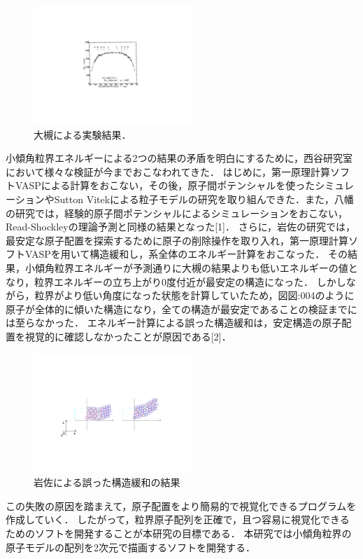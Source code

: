 \begin{figure}[htbp]\begin{center}
\includegraphics[width=6cm,bb=0 0 442 500]{../figs/./boundary_narita.003.jpg}
\caption{大槻による実験結果．}
\label{default}\end{center}\end{figure}
小傾角粒界エネルギーによる2つの結果の矛盾を明白にするために，西谷研究室において様々な検証が今までおこなわれてきた．
はじめに，第一原理計算ソフトVASPによる計算をおこない，その後，原子間ポテンシャルを使ったシミュレーションやSutton Vitekによる粒子モデルの研究を取り組んできた．また，八幡の研究では，経験的原子間ポテンシャルによるシミュレーションをおこない，Read-Shockleyの理論予測と同様の結果となった[1]．
さらに，岩佐の研究では，最安定な原子配置を探索するために原子の削除操作を取り入れ，第一原理計算ソフトVASPを用いて構造緩和し，系全体のエネルギー計算をおこなった．
その結果，小傾角粒界エネルギーが予測通りに大槻の結果よりも低いエネルギーの値となり，粒界エネルギーの立ち上がり0度付近が最安定の構造になった．
しかしながら，粒界がより低い角度になった状態を計算していたため，図{図:004}のように原子が全体的に傾いた構造になり，全ての構造が最安定であることの検証までには至らなかった．
エネルギー計算による誤った構造緩和は，安定構造の原子配置を視覚的に確認しなかったことが原因である[2]．

\begin{figure}[htbp]\begin{center}
\includegraphics[width=6cm,bb=0 0 442 500]{../figs/./boundary_narita.004.jpg}
\caption{岩佐による誤った構造緩和の結果}
\label{default}\end{center}\end{figure}
この失敗の原因を踏まえて，原子配置をより簡易的で視覚化できるプログラムを作成していく．
したがって，粒界原子配列を正確で，且つ容易に視覚化できるためのソフトを開発することが本研究の目標である．
本研究では小傾角粒界の原子モデルの配列を2次元で描画するソフトを開発する．

